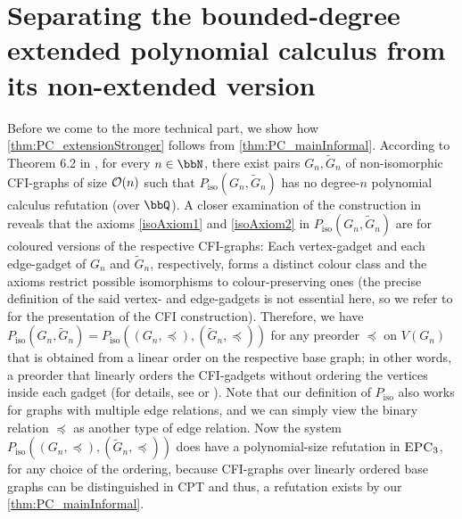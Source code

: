 \documentclass[10pt,a4paper]{article}
\newcommand{\EPC}{\mbox{\sc EPC}}
\newcommand{\Oo}{{\cal O}}
\newcommand{\Piso}{P_{\text{iso}}}
\begin{document}
	\section{Separating the bounded-degree extended polynomial calculus from its non-extended version}
	\label{sec:PC_separation}
	Before we come to the more technical part, we show how \autoref{thm:PC_extensionStronger} follows from \autoref{thm:PC_mainInformal}. According to Theorem 6.2 in \cite{berkholz}, for every $n \in \bbN$, there exist pairs $G_n, \widetilde{G}_n$ of non-isomorphic CFI-graphs of size $\Oo(n)$ such that $\Piso(G_n, \widetilde{G}_n)$ has no degree-$n$ polynomial calculus refutation (over $\bbQ$). A closer examination of the construction in \cite{berkholz} reveals that the axioms \eqref{isoAxiom1} and \eqref{isoAxiom2} in $\Piso(G_n, \widetilde{G}_n)$ are for coloured versions of the respective CFI-graphs: Each vertex-gadget and each edge-gadget of $G_n$ and $\widetilde{G}_n$, respectively, forms a distinct colour class and the axioms restrict possible isomorphisms to colour-preserving ones (the precise definition of the said vertex- and edge-gadgets is not essential here, so we refer to \cite{dawar2008} for the presentation of the CFI construction). 
	Therefore, we have $\Piso(G_n, \widetilde{G}_n) = \Piso((G_n, \preceq), (\widetilde{G}_n, \preceq))$ for any preorder $\preceq$ on $V(G_n)$ that is obtained from a linear order on the respective base graph; in other words, a preorder that linearly orders the CFI-gadgets without ordering the vertices inside each gadget (for details, see \cite{caifurimm92} or \cite{dawar2008}). Note that our definition of $\Piso$ also works for graphs with multiple edge relations, and we can simply view the binary relation $\preceq$ as another type of edge relation.
	Now the system $\Piso((G_n, \preceq), (\widetilde{G}_n, \preceq))$ does have a polynomial-size refutation in $\EPC_3$, for any choice of the ordering, because CFI-graphs over linearly ordered base graphs can be distinguished in CPT \cite{dawar2008} and thus, a refutation exists by our \autoref{thm:PC_mainInformal}.
	
\end{document}
